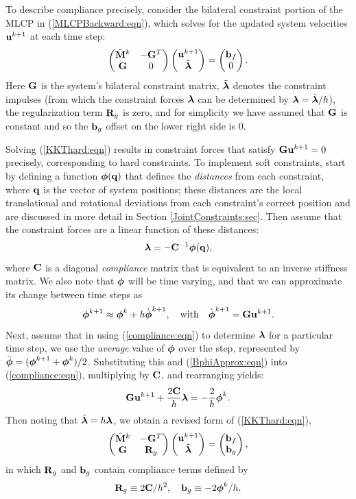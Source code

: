 To describe compliance precisely, consider the bilateral constraint
portion of the MLCP in (\ref{MLCPBackward:eqn}), which solves for the
updated system velocities ${\bf u}^{k+1}$ at each time step:
%
\begin{equation}
\left(\begin{matrix}
\hat{{\bf M}}^{k} & -{\bf G}^{T} \\
{\bf G} & 0
\end{matrix}\right)
\left(\begin{matrix}
{\bf u}^{k+1} \\
\tilde{\boldsymbol\lambda}
\end{matrix}\right)
=
\left(\begin{matrix}
{\bf b}_f \\
0
\end{matrix}\right).
\label{KKThard:eqn}
\end{equation}
%
Here ${\bf G}$ is the system's bilateral constraint matrix, $\tilde{\boldsymbol\lambda}$ denotes
the constraint impulses (from which the constraint forces $\boldsymbol\lambda$ can be
determined by $\boldsymbol\lambda = \tilde{\boldsymbol\lambda}/h$), the regularization term ${\bf R}_g$ is zero,
and for simplicity we have assumed that ${\bf G}$ is constant and so the ${\bf b}_g$ offset
on the lower right side is $0$.

Solving (\ref{KKThard:eqn}) results in constraint forces that satisfy
${\bf G} {\bf u}^{k+1} = 0$ precisely, corresponding to hard constraints. To
implement soft constraints, start by defining a function $\boldsymbol\phi({\bf q})$
that defines the {\it distances} from each constraint, where ${\bf q}$ is the
vector of system positions; these distances are
the local translational and rotational deviations from each
constraint's correct position and are discussed in more detail in
Section \ref{JointConstraints:sec}. Then assume that the constraint
forces are a linear function of these distances:
%
\begin{equation}
\boldsymbol\lambda = -{\bf C}^{-1} \boldsymbol\phi({\bf q}),
\label{compliance:eqn}
\end{equation}
%
where ${\bf C}$ is a diagonal {\it compliance} matrix that is equivalent to
an inverse stiffness matrix. We also note that $\boldsymbol\phi$ will be time
varying, and that we can approximate its change between time steps as
%
\begin{equation}
\boldsymbol\phi^{k+1} \approx \boldsymbol\phi^k + h \dot{\boldsymbol\phi}^{k+1}, \quad \text{with}
\quad \dot{\boldsymbol\phi}^{k+1} = {\bf G} {\bf u}^{k+1}.
\label{BphiApprox:eqn}
\end{equation}
%
Next, assume that in using (\ref{compliance:eqn}) to determine $\boldsymbol\lambda$
for a particular time step, we use the {\it average} value of $\boldsymbol\phi$
over the step, represented by $\bar{\boldsymbol\phi} = (\boldsymbol\phi^{k+1} + \boldsymbol\phi^k)/2$.
Substituting this and (\ref{BphiApprox:eqn}) into
(\ref{compliance:eqn}), multiplying by ${\bf C}$, and rearranging yields:
%
\begin{equation}
{\bf G} {\bf u}^{k+1} + \frac{2 {\bf C}}{h} \boldsymbol\lambda = -\frac{2}{h} \boldsymbol\phi^k.
\end{equation}
%
Then noting that $\tilde{\boldsymbol\lambda} = h \boldsymbol\lambda$, we obtain
a revised form of (\ref{KKThard:eqn}),
%
\begin{equation}
\left(\begin{matrix}
\hat{{\bf M}}^{k} & -{\bf G}^{T} \\
{\bf G} & {\bf R}_g
\end{matrix}\right)
\left(\begin{matrix}
{\bf u}^{k+1} \\
\tilde{\boldsymbol\lambda}
\end{matrix}\right)
=
\left(\begin{matrix}
{\bf b}_f \\
{\bf b}_g 
\end{matrix}\right),
\label{KKTsoft:eqn}
\end{equation}
%
in which ${\bf R}_g$ and ${\bf b}_g$ contain compliance terms defined by
%
\begin{equation*}
{\bf R}_g \equiv 2 {\bf C} /h^2, \quad {\bf b}_g \equiv - 2 \boldsymbol\phi^k/h.
\end{equation*}
%

